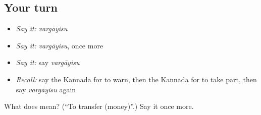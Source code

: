 \subsection*{Your turn}
\begin{itemize}
\raggedright
  \item \emph{Say it:} \emph{vargāyisu}
  \item \emph{Say it:} \emph{vargāyisu}, once more
  \item \emph{Say it:} say \emph{vargāyisu}
  \item \emph{Recall:} say the Kannada for to warn, then the Kannada for to take part, then say \emph{vargāyisu} again
\end{itemize}

\begin{tcolorbox}[breakable,colback=teal!4,colframe=teal!35!black,title={Before you move on}]
What does  mean? (\textquotedblleft{}To transfer (money)\textquotedblright{}.) Say it once more.
\end{tcolorbox}
